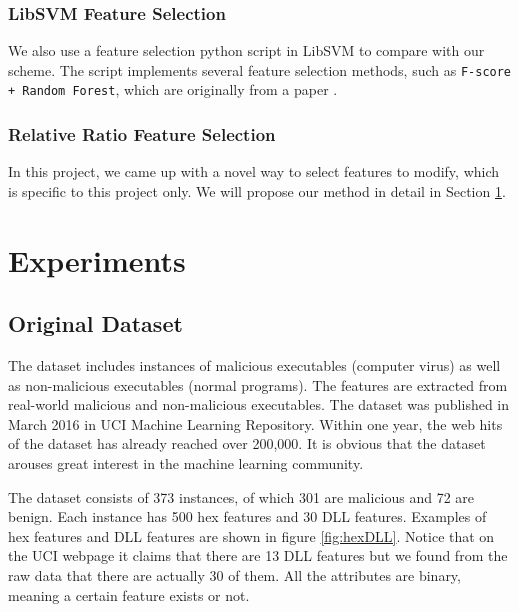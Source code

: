 \documentclass[11pt]{article}
\begin{document}
\subsubsection{LibSVM Feature Selection}
We also use a feature selection python script in LibSVM to compare with our scheme. The script implements several feature selection methods, such as \texttt{F-score + Random Forest}, which are originally from a paper \cite{chen2006combining}. 

\subsubsection{Relative Ratio Feature Selection}
In this project, we came up with a novel way to select features to modify, which is specific to this project only. We will propose our method in detail in Section \ref{sec:exp}.

\section{Experiments}\label{sec:exp}


\subsection{Original Dataset}
The dataset includes instances of malicious executables (computer virus) as well as non-malicious executables (normal programs). The features are extracted from real-world malicious and non-malicious executables. The dataset was published in March 2016 in UCI Machine Learning Repository. Within one year, the web hits of the dataset has already reached over 200,000. It is obvious that the dataset arouses great interest in the machine learning community.

The dataset consists of 373 instances, of which 301 are malicious and 72 are benign. Each instance has 500 hex features and 30 DLL features. Examples of hex features and DLL features are shown in figure \ref{fig:hexDLL}. Notice that on the UCI webpage it claims that there are 13 DLL features but we found from the raw data that there are actually 30 of them. All the attributes are binary, meaning a certain feature exists or not. 
\end{document}
